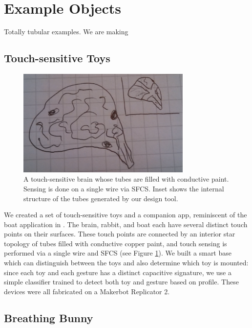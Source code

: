 \section{Example Objects}

Totally tubular examples.  We are making

\subsection{Touch-sensitive Toys}

\begin{figure}[h]
\centering
    \includegraphics[width=3.4in]{figures/placeholder/brain.jpg}
\caption{A touch-sensitive brain whose tubes are filled with conductive paint.  Sensing is done on a single wire via SFCS.  Inset shows the internal structure of the tubes generated by our design tool.}
\label{fig:toys}
\end{figure}

We created a set of touch-sensitive toys and a companion app, reminiscent of the boat application in \cite{Harrison-acoustic}.  The brain, rabbit, and boat each have several distinct touch points on their surfaces.  These touch points are connected by an interior star topology of tubes filled with conductive copper paint, and touch sensing is performed via a single wire and SFCS (see Figure \ref{fig:toys}).  We built a smart base which can distinguish between the toys and also determine which toy is mounted: since each toy and each gesture has a distinct capacitive signature, we use a simple classifier trained to detect both toy and gesture based on profile.  These devices were all fabricated on a Makerbot Replicator 2.

\subsection{Breathing Bunny}

